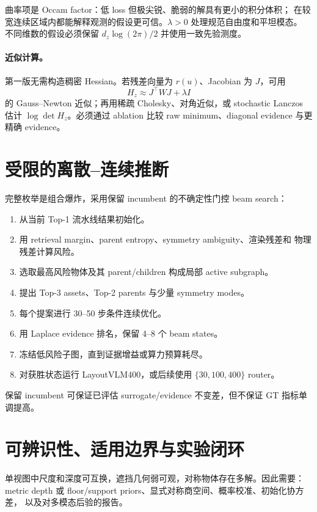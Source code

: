 \documentclass[11pt,a4paper]{ctexart}
\begin{document}
曲率项是 Occam factor：低 loss 但极尖锐、脆弱的解具有更小的积分体积；
在较宽连续区域内都能解释观测的假设更可信。$\lambda>0$ 处理规范自由度和平坦模态。
不同维数的假设必须保留 $d_z\log(2\pi)/2$ 并使用一致先验测度。

\paragraph{近似计算。}
第一版无需构造稠密 Hessian。若残差向量为 $r(u)$、Jacobian 为 $J$，可用
\begin{equation}
 H_z\approx J^\top WJ+\lambda I
\end{equation}
的 Gauss--Newton 近似；再用稀疏 Cholesky、对角近似，或 stochastic Lanczos
估计 $\log\det H_z$。必须通过 ablation 比较 raw minimum、diagonal evidence
与更精确 evidence。

\section{受限的离散--连续推断}
完整枚举是组合爆炸，采用保留 incumbent 的不确定性门控 beam search：
\begin{enumerate}
  \item 从当前 Top-1 流水线结果初始化。
  \item 用 retrieval margin、parent entropy、symmetry ambiguity、渲染残差和
  物理残差计算风险。
  \item 选取最高风险物体及其 parent/children 构成局部 active subgraph。
  \item 提出 Top-3 assets、Top-2 parents 与少量 symmetry modes。
  \item 每个提案进行 30--50 步条件连续优化。
  \item 用 Laplace evidence 排名，保留 4--8 个 beam states。
  \item 冻结低风险子图，直到证据增益或算力预算耗尽。
  \item 对获胜状态运行 LayoutVLM400，或后续使用 $\{30,100,400\}$ router。
\end{enumerate}
保留 incumbent 可保证已评估 surrogate/evidence 不变差，但不保证 GT 指标单调提高。

\section{可辨识性、适用边界与实验闭环}
单视图中尺度和深度可互换，遮挡几何弱可观，对称物体存在多解。因此需要：
metric depth 或 floor/support priors、显式对称商空间、概率校准、初始化协方差，
以及对多模态后验的报告。
\end{document}
